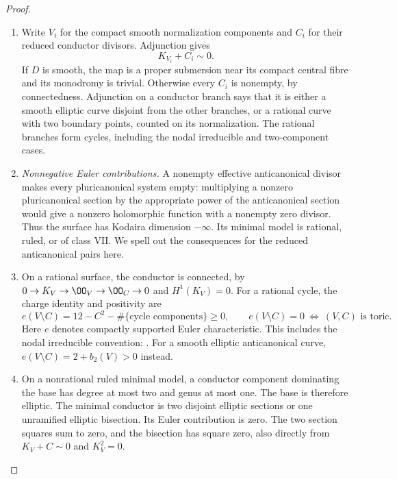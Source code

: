 \begin{proof}
\begin{enumerate}[label=\arabic*.,leftmargin=*]
\item Write $V_i$ for the compact smooth normalization
components and $C_i$ for their reduced conductor divisors.
Adjunction gives
\begin{equation}
 K_{V_i}+C_i\sim0.
\label{pub:I:eq:B-4-28-2}
\end{equation}
If $D$ is smooth, the map is a proper submersion near
its compact central fibre and its monodromy is trivial.
Otherwise every $C_i$ is nonempty, by connectedness.
Adjunction on a conductor branch says that it is either
a smooth elliptic curve disjoint from the other branches,
or a rational curve with two boundary points, counted
on its normalization. The rational branches form cycles,
including the nodal irreducible and two-component cases.

\item \emph{Nonnegative Euler contributions.}
A nonempty effective anticanonical divisor makes every
pluricanonical system empty: multiplying a nonzero
pluricanonical section by the appropriate power of the
anticanonical section would give a nonzero holomorphic
function with a nonempty zero divisor. Thus the surface
has Kodaira dimension $-\infty$. Its minimal model is
rational, ruled, or of class VII. We spell out the
consequences for the reduced anticanonical pairs here.

\item On a rational surface, the conductor is connected, by
$0\to K_V\to\OO_V\to\OO_C\to0$ and $H^1(K_V)=0$.
For a rational cycle, the charge identity and positivity
are
\begin{equation}
 e(V\setminus C)=12-C^2-\#\{\text{cycle components}\}
 \ge0,\qquad
 e(V\setminus C)=0\ \Longleftrightarrow\ (V,C)
 \text{ is toric}.
\label{pub:I:eq:B-4-28-3}
\end{equation}
Here $e$ denotes compactly supported Euler characteristic.
This includes the nodal irreducible convention:
\citet[arXiv version~2, Section~1, p.~3; Definition~1.1 and Lemma~1.2, pp.~4--5; Lemma~2.2, p.~11; Lemma~2.7, p.~14]{Friedman2016AB}.
For a smooth elliptic anticanonical curve,
$e(V\setminus C)=2+b_2(V)>0$ instead.

\item On a nonrational ruled minimal model, a conductor
component dominating the base has degree at most two
and genus at most one. The base is therefore elliptic.
The minimal conductor is two disjoint elliptic sections
or one unramified elliptic bisection. Its Euler
contribution is zero. The two section squares sum to
zero, and the bisection has square zero, also directly
from $K_V+C\sim0$ and $K_V^2=0$.


\end{enumerate}
\end{proof}
